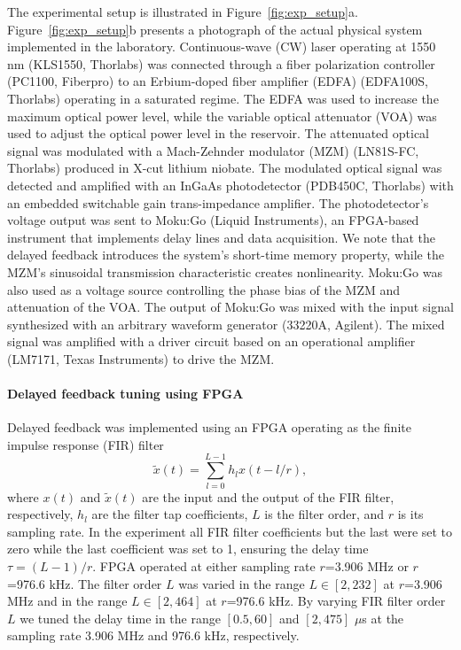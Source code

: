 \documentclass{WileyMSP-template}
\begin{document}
\FloatBarrier
The experimental setup is illustrated in Figure~\ref{fig:exp_setup}a. Figure~\ref{fig:exp_setup}b presents a photograph of the actual physical system implemented in the laboratory. Continuous-wave (CW) laser operating at 1550 nm (KLS1550, Thorlabs) was connected through a fiber polarization controller (PC1100, Fiberpro) to an Erbium-doped fiber amplifier (EDFA) (EDFA100S, Thorlabs) operating in a saturated regime.
The EDFA was used to increase the maximum optical power level, while the variable optical attenuator (VOA) was used to adjust the optical power level in the reservoir.
The attenuated optical signal was modulated with a Mach-Zehnder modulator (MZM) (LN81S-FC, Thorlabs) produced in X-cut lithium niobate.
The modulated optical signal was detected and amplified with an InGaAs photodetector (PDB450C, Thorlabs) with an embedded switchable gain trans-impedance amplifier.
The photodetector's voltage output was sent to Moku:Go (Liquid Instruments), an FPGA-based instrument that implements delay lines and data acquisition.
We note that the delayed feedback introduces the system's short-time memory property, while the MZM's sinusoidal transmission characteristic creates nonlinearity.
Moku:Go was also used as a voltage source controlling the phase bias of the MZM and attenuation of the VOA.
The output of Moku:Go was mixed with the input signal synthesized with an arbitrary waveform generator (33220A, Agilent).
The mixed signal was amplified with a driver circuit based on an operational amplifier (LM7171, Texas Instruments) to drive the MZM.

\paragraph{Delayed feedback tuning using FPGA}
Delayed feedback was implemented using an FPGA operating as the finite impulse response (FIR) filter 
\begin{equation}
  {\tilde x}(t)=\sum_{l=0}^{L-1}h_lx(t-l/r),
  \label{eq:delay-tuning}
\end{equation}
where $x(t)$ and ${\tilde x}(t)$ are the input and the output of the FIR filter, respectively, $h_l$ are the filter tap coefficients, $L$ is the filter order, and $r$ is its sampling rate.
In the experiment all FIR filter coefficients but the last were set to zero while the last coefficient was set to 1, ensuring the delay time $\tau=(L-1)/r$.
FPGA operated at either sampling rate $r$=3.906 MHz or $r$=976.6 kHz.
The filter order $L$ was varied in the range $L\in[2,232]$ at $r$=3.906 MHz and in the range $L\in[2,464]$ at $r$=976.6 kHz.
By varying FIR filter order $L$ we tuned the delay time in the range $[0.5, 60]$ and $[2, 475]$ $\mu$s at the sampling rate 3.906 MHz and 976.6 kHz, respectively.
\end{document}
